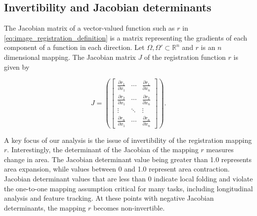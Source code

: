 \documentclass[lettersize,journal]{IEEEtran}
\begin{document}
\subsection{Invertibility and Jacobian determinants}
\label{sec:jacobian_determinants}

The Jacobian matrix of a vector-valued function such as $r$ in \autoref{eq:image_registration_definition} is a matrix representing the gradients of each component of a function in each direction. 
Let $\Omega, \Omega' \subset \mathbb{R}^n$ and $r$ is an $n$ dimensional mapping. The Jacobian matrix $J$ of the registration function $r$ is given by

\begin{equation} \label{eq:general_jacobian_matrix}
    J = 
    \left( 
        \begin{bmatrix}
            \frac{\partial r_1}{\partial x_1} & \cdots & \frac{\partial r_1}{\partial x_n} \\
            \frac{\partial r_2}{\partial x_1} & \cdots & \frac{\partial r_2}{\partial x_n} \\
            \vdots & \ddots & \vdots \\
            \frac{\partial r_n}{\partial x_1} & \cdots & \frac{\partial r_n}{\partial x_n}
        \end{bmatrix}
    \right).
\end{equation}

A key focus of our analysis is the issue of invertibility of the registration mapping $r$. Interestingly, the determinant of the Jacobian of the mapping $r$ measures change in area. The Jacobian determinant value being greater than 1.0 represents area expansion, while values between 0 and 1.0 represent area contraction. Jacobian determinant values that are less than 0 indicate local folding and violate the one-to-one mapping assumption critical for many tasks, including longitudinal analysis and feature tracking. At these points with negative Jacobian determinants, the mapping $r$ becomes non-invertible.

\end{document}
